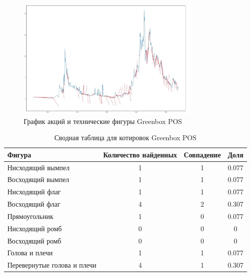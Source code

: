 \documentclass[bachelor, och, coursework]{SCWorks}
\begin{document}
    \begin{figure}[H]
        \centering
        \includegraphics[width=0.8\textwidth]{pic/GBOX.jpg}
        \caption{График акций и технические фигуры Greenbox POS}
    \end{figure}
   
    \begin{table}[!hbt]
        \centering
        \begin{tabular}{|l|c|c|c|}
        \hline
        Фигура                      & \multicolumn{1}{l|}{Количество найденных} & Совпадение & Доля  \\ \hline
        Нисходящий вымпел           & 1                                         & 1          & 0.077 \\ \hline
        Восходящий вымпел           & 1                                         & 1          & 0.077 \\ \hline
        Нисходящий флаг             & 1                                         & 1          & 0.077 \\ \hline
        Восходящий флаг             & 4                                         & 2          & 0.307 \\ \hline
        Прямоугольник               & 1                                         & 0          & 0.077 \\ \hline
        Нисходящий ромб             & 0                                         & 0          & 0     \\ \hline
        Восходящий ромб             & 0                                         & 0          & 0     \\ \hline
        Голова и плечи              & 1                                         & 1          & 0.077 \\ \hline
        Перевернутые голова и плечи & 4                                         & 1          & 0.307 \\ \hline
        \end{tabular}
        \captionsetup{justification=centering}
        \caption{Сводная таблица для котировок Greenbox POS}    
    \end{table}
\end{document}
